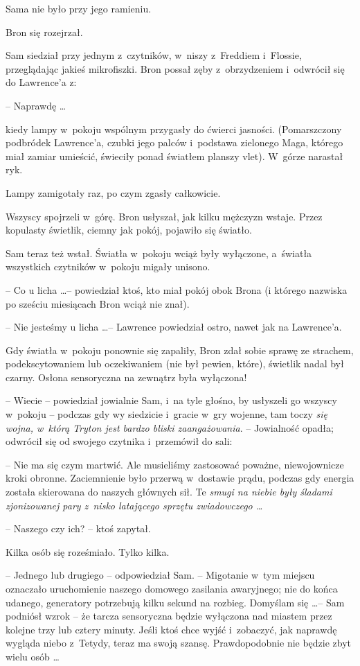 \documentclass[oneside,polish,11pt,rmheadings]{mwbk}
\begin{document}
Sama nie było przy jego ramieniu. 

Bron się rozejrzał. 

Sam siedział przy jednym z~czytników, w~niszy z~Freddiem i~Flossie, przeglądając jakieś mikrofiszki. Bron possał zęby z~obrzydzeniem i~odwrócił się do Lawrence'a z: 

-- Naprawdę \ldots 

kiedy lampy w~pokoju wspólnym przygasły do ćwierci jasności. (Pomarszczony podbródek Lawrence'a, czubki jego palców i~podstawa zielonego Maga, którego miał zamiar umieścić, świeciły ponad światłem planszy vlet). W~górze narastał ryk. 

Lampy zamigotały raz, po czym zgasły całkowicie. 

Wszyscy spojrzeli w~górę. Bron usłyszał, jak kilku mężczyzn wstaje. Przez kopulasty świetlik, ciemny jak pokój, pojawiło się światło. 

Sam teraz też wstał. Światła w~pokoju wciąż były wyłączone, a~światła wszystkich czytników w~pokoju migały unisono. 

-- Co u licha \ldots  -- powiedział ktoś, kto miał pokój obok Brona (i którego nazwiska po sześciu miesiącach Bron wciąż nie znał). 

-- Nie jesteśmy u licha \ldots  -- Lawrence powiedział ostro, nawet jak na Lawrence'a. 

Gdy światła w~pokoju ponownie się zapaliły, Bron zdał sobie sprawę ze strachem, podekscytowaniem lub oczekiwaniem (nie był pewien, które), świetlik nadal był czarny. Osłona sensoryczna na zewnątrz była wyłączona! 

-- Wiecie -- powiedział jowialnie Sam, i~na tyle głośno, by usłyszeli go wszyscy w~pokoju -- podczas gdy wy siedzicie i~gracie w~gry wojenne, tam toczy \textit{się wojna, w~którą Tryton jest bardzo bliski zaangażowania}. -- Jowialność opadła; odwrócił się od swojego czytnika i~przemówił do sali: 

-- Nie ma się czym martwić.  Ale musieliśmy zastosować poważne, niewojownicze kroki obronne. Zaciemnienie było przerwą w~dostawie prądu, podczas gdy energia została skierowana do naszych głównych sił. Te \textit{smugi na niebie były śladami zjonizowanej pary z~nisko latającego sprzętu zwiadowczego \ldots } 

-- Naszego czy ich? -- ktoś zapytał. 

Kilka osób się roześmiało. Tylko kilka. 

-- Jednego lub drugiego -- odpowiedział Sam. -- Migotanie w~tym miejscu oznaczało uruchomienie naszego domowego zasilania awaryjnego; nie do końca udanego, generatory potrzebują kilku sekund na rozbieg. Domyślam się \ldots  -- Sam podniósł wzrok -- że tarcza sensoryczna będzie wyłączona nad miastem przez kolejne trzy lub cztery minuty. Jeśli ktoś chce wyjść i~zobaczyć, jak naprawdę wygląda niebo z~Tetydy, teraz ma swoją szansę. Prawdopodobnie nie będzie zbyt wielu osób \ldots  
\end{document}
